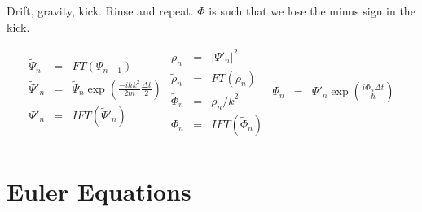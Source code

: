 \documentclass{article}
\begin{document}
Drift, gravity, kick. Rinse and repeat. $\Phi$ is such that we lose the minus sign
in the kick.

\begin{equation}
\begin{array}{rcl}
%
\tilde\Psi_n &=& FT(\Psi_{n-1}) \\
\tilde\Psi'_n &=& \tilde\Psi_n\exp(\frac{-i\hbar k^2}{2m}\frac{\Delta t}{2}) \\
\Psi'_n &=& IFT(\tilde\Psi'_n) \\
\end{array}
%
\begin{array}{rcl}
\rho_n &=& |\Psi'_n|^2 \\
\tilde\rho_n &=& FT(\rho_n) \\
\tilde\Phi_n &=& \tilde\rho_n / k^2 \\
\Phi_n &=& IFT( \tilde\Phi_n) \\
\end{array}
%
\begin{array}{rcl}
\Psi_n &=& \Psi'_n\exp(\frac{i\Phi_n\Delta t}{\hbar}) \\
\end{array}
%
\end{equation}


\section{Euler Equations}
\end{document}
